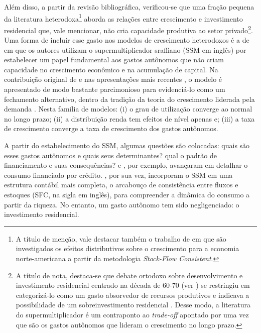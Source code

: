 Além disso, a partir da revisão bibliográfica, verificou-se que uma fração pequena da literatura heterodoxa\footnote{
	A título de menção, vale destacar também o trabalho de \textcite{zezza_u.s._2008} em que são investigados os efeitos distributivos sobre o crescimento para a economia norte-americana a partir da metodologia \textit{Stock-Flow Consistent}.}
aborda as relações entre crescimento e investimento residencial que, vale mencionar, não cria capacidade produtiva ao setor privado\footnote{A título de nota, destaca-se que debate ortodoxo sobre desenvolvimento e investimento residencial centrado na década de 60-70 (ver \textcite{arku_housing_2006}) se restringiu em categorizá-lo como um gasto absorvedor de recursos produtivos \cite{solow_importance_1995} e indicava  a possibilidade de um sobreinvestimento residencial \cite{mills_has_1987}. Desse modo, a literatura do supermultiplicador é um contraponto ao \textit{trade-off} apontado por \textcite{solow_importance_1995} uma vez que são os gastos autônomos que lideram o crescimento no longo prazo. 
}. Uma forma de incluir esse gasto nos modelos de crescimento heterodoxos é a de \textcite{da_silveira_investimento_2019} em que os autores utilizam o supermultiplicador sraffiano (SSM em inglês) por estabelecer um papel fundamental aos gastos autônomos que não criam capacidade no crescimento econômico e na acumulação de capital. Na contribuição original de \textcite{serrano_sraffian_1995} e nas apresentações mais recentes \cite{freitas_growth_2015}, o modelo é apresentado de modo bastante parcimonioso para evidenciá-lo como um fechamento alternativo, dentro da tradição da teoria do crescimento liderada pela demanda \cite{serrano_sraffian_2017}. Nesta família de modelos: (i) o grau de utilização converge ao normal no longo prazo; (ii) a distribuição renda tem efeitos de nível apenas e; (iii) a taxa de crescimento converge a taxa de crescimento dos gastos autônomos.

A partir do estabelecimento do SSM, algumas questões são colocadas: quais são esses gastos autônomos e quais seus determinantes? qual o padrão de financiamento e suas consequências? \textcite{pariboni_household_2016} e \textcite{fagundes_role_2017}, por exemplo, avançaram em detalhar o consumo financiado por crédito.  \textcite{brochier_supermultiplier_2018}, por sua vez, incorporam o SSM em uma estrutura contábil mais completa, o arcabouço de consistência entre fluxos e estoques (SFC, na sigla em inglês), para compreender a dinâmica do consumo a partir da riqueza. No entanto, um gasto autônomo tem sido negligenciado: o investimento residencial. 

